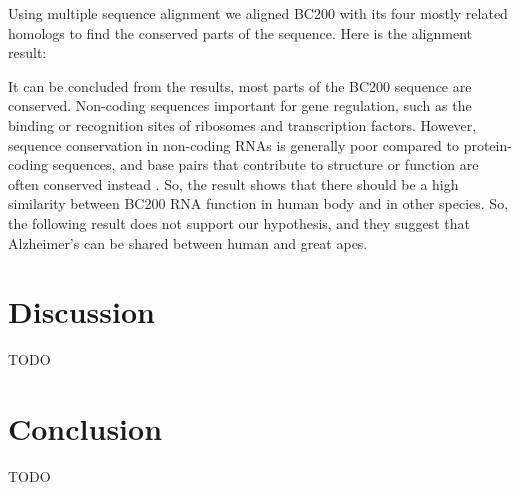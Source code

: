 \documentclass[conference, 11pt]{IEEEtran}
\begin{document}
Using multiple sequence alignment we aligned BC200 with its four mostly related homologs to find the conserved parts of the sequence.
Here is the alignment result:


It can be concluded from the results, most parts of the BC200 sequence are conserved. 
Non-coding sequences important for gene regulation, such as the binding or recognition sites of ribosomes and transcription factors. 
However, sequence conservation in non-coding RNAs is generally poor compared to protein-coding sequences, and base pairs that contribute to structure or function are often conserved instead \cite{johnsson2014evolutionary}. 
So, the result shows that there should be a high similarity between BC200 RNA function in human body and in other species. 
So, the following result does not support our hypothesis, and they suggest that Alzheimer’s can be shared between human and great apes.

\section{Discussion}\label{sec:discussion}
TODO

\section{Conclusion}\label{sec:conclusion}
TODO



\end{document}

